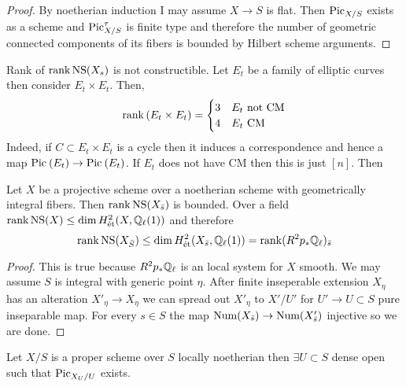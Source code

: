 \documentclass[12pt]{article}
\begin{document}
\begin{proof}
By noetherian induction I may assume $X \to S$ is flat. Then $\mathrm{Pic}_{X/S}$ exists as a scheme and $\mathrm{Pic}_{X/S}^{\tau}$ is finite type and therefore the number of geometric connected components of its fibers is bounded by Hilbert scheme arguments.
\end{proof}

\begin{example}
Rank of $\operatorname{\mathrm{rank}}{\mathrm{NS}(X_s)}$ is not constructible. Let $E_t$ be a family of elliptic curves then consider $E_t \times E_t$. Then,
\[ \operatorname{\mathrm{rank}}{(E_t \times E_t)} = 
\begin{cases}
3 & E_t \text{ not CM}
\\
4 & E_t \text{ CM} 
\end{cases} \]
Indeed, if $C \subset E_t \times E_t$ is a cycle then it induces a correspondence and hence a map $\mathrm{Pic}^{} \left( E_t \right) \to \mathrm{Pic}^{} \left( E_t \right)$. If $E_t$ does not have CM then this is just $[n]$. Then
\end{example}

\begin{theorem}
Let $X$ be a projective scheme over a noetherian scheme with geometrically integral fibers. Then $\operatorname{\mathrm{rank}}{\mathrm{NS}(X_{\bar{s}})}$ is bounded. Over a field $\operatorname{\mathrm{rank}}{\mathrm{NS}(X)} \le \dim H^2_{\text{\'{e}t}}(X, \mathbb{Q}_\ell(1))$ and therefore
\[ \operatorname{\mathrm{rank}}{\mathrm{NS}(X_{\bar{S}})} \le \dim H^2_{\text{\'{e}t}}(X_{\bar{s}}, \mathbb{Q}_\ell(1)) = \operatorname{\mathrm{rank}} (R^2 p_* \mathbb{Q}_{\ell})_{\bar{s}} \]
\end{theorem}

\begin{proof}
This is true because $R^2 p_* \mathbb{Q}_\ell$ is an \etale local system for $X$ smooth. We may assume $S$ is integral with generic point $\eta$. After finite inseperable extension $X_\eta$ has an alteration $X'_{\eta} \to X_\eta$ we can spread out $X'_\eta$ to $X' / U'$ for $U' \to U \subset S$ pure inseparable map. For every $s \in S$ the map $\mathrm{Num}(X_{\bar{s}}) \to \mathrm{Num}(X'_{\bar{s}})$ injective so we are done. 
\end{proof}

\begin{theorem}
Let $X/S$ is a proper scheme over $S$ locally noetherian then $\exists U \subset S$ dense open such that $\mathrm{Pic}_{X_U/U}$ exists. 
\end{theorem}

\begin{cor}

\end{cor}
\end{document}
